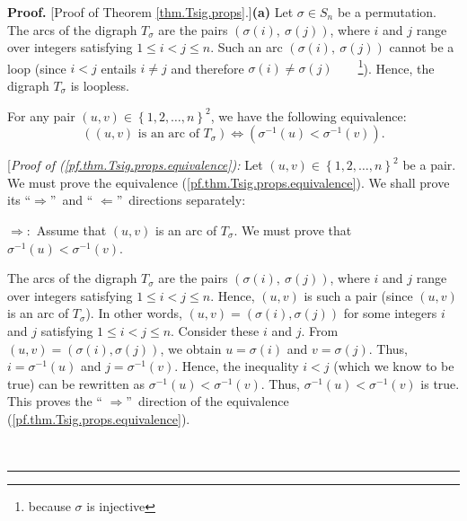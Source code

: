 \documentclass[numbers=enddot,12pt,final,onecolumn,notitlepage]{scrartcl}%
\numberwithin{exer}{subsection}
\theoremstyle{definition}
\newenvironment{fineprint}{\begin{small}}{\end{small}}
\newenvironment{proof}[1][Proof]{\noindent\textbf{#1.} }{\ \rule{0.5em}{0.5em}}
\begin{document}
\begin{proof}
[Proof of Theorem \ref{thm.Tsig.props}.]\textbf{(a)} Let $\sigma\in S_{n}$ be
a permutation. The arcs of the digraph $T_{\sigma}$ are the pairs $\left(
\sigma\left(  i\right)  ,\ \sigma\left(  j\right)  \right)  $, where $i$ and
$j$ range over integers satisfying $1\leq i<j\leq n$. Such an arc $\left(
\sigma\left(  i\right)  ,\ \sigma\left(  j\right)  \right)  $ cannot be a loop
(since $i<j$ entails $i\neq j$ and therefore $\sigma\left(  i\right)
\neq\sigma\left(  j\right)  $\ \ \ \ \footnote{because $\sigma$ is
injective}). Hence, the digraph $T_{\sigma}$ is loopless.

For any pair $\left(  u,v\right)  \in\left\{  1,2,\ldots,n\right\}  ^{2}$, we
have the following equivalence:%
\begin{equation}
\left(  \left(  u,v\right)  \text{ is an arc of }T_{\sigma}\right)
\Longleftrightarrow\left(  \sigma^{-1}\left(  u\right)  <\sigma^{-1}\left(
v\right)  \right)  . \label{pf.thm.Tsig.props.equivalence}%
\end{equation}


\begin{fineprint}
[\textit{Proof of (\ref{pf.thm.Tsig.props.equivalence}):} Let $\left(
u,v\right)  \in\left\{  1,2,\ldots,n\right\}  ^{2}$ be a pair. We must prove
the equivalence (\ref{pf.thm.Tsig.props.equivalence}). We shall prove its
\textquotedblleft$\Longrightarrow$\textquotedblright\ and \textquotedblleft%
$\Longleftarrow$\textquotedblright\ directions separately:

$\Longrightarrow:$ Assume that $\left(  u,v\right)  $ is an arc of $T_{\sigma
}$. We must prove that $\sigma^{-1}\left(  u\right)  <\sigma^{-1}\left(
v\right)  $.

The arcs of the digraph $T_{\sigma}$ are the pairs $\left(  \sigma\left(
i\right)  ,\ \sigma\left(  j\right)  \right)  $, where $i$ and $j$ range over
integers satisfying $1\leq i<j\leq n$. Hence, $\left(  u,v\right)  $ is such a
pair (since $\left(  u,v\right)  $ is an arc of $T_{\sigma}$). In other words,
$\left(  u,v\right)  =\left(  \sigma\left(  i\right)  ,\sigma\left(  j\right)
\right)  $ for some integers $i$ and $j$ satisfying $1\leq i<j\leq n$.
Consider these $i$ and $j$. From $\left(  u,v\right)  =\left(  \sigma\left(
i\right)  ,\sigma\left(  j\right)  \right)  $, we obtain $u=\sigma\left(
i\right)  $ and $v=\sigma\left(  j\right)  $. Thus, $i=\sigma^{-1}\left(
u\right)  $ and $j=\sigma^{-1}\left(  v\right)  $. Hence, the inequality $i<j$
(which we know to be true) can be rewritten as $\sigma^{-1}\left(  u\right)
<\sigma^{-1}\left(  v\right)  $. Thus, $\sigma^{-1}\left(  u\right)
<\sigma^{-1}\left(  v\right)  $ is true. This proves the \textquotedblleft%
$\Longrightarrow$\textquotedblright\ direction of the equivalence
(\ref{pf.thm.Tsig.props.equivalence}).


\end{fineprint}
\end{proof}
\end{document}
